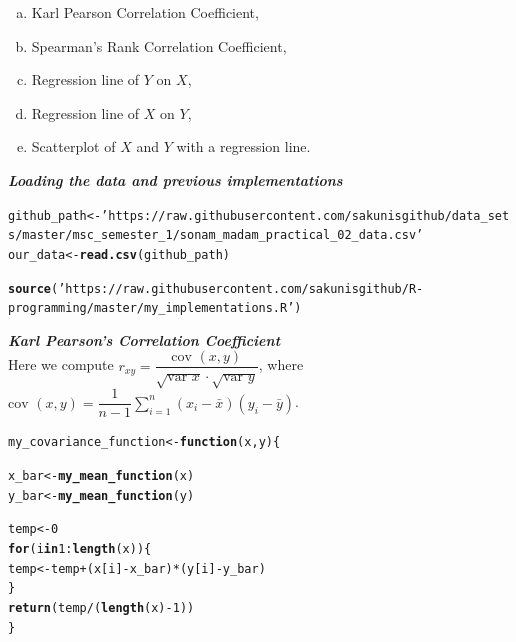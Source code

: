 \documentclass[11pt, a4paper]{article}\usepackage[]{graphicx}\usepackage[]{xcolor}
\makeatletter
\newcommand{\hlnum}[1]{\textcolor[rgb]{0.686,0.059,0.569}{#1}}%
\newcommand{\hlsng}[1]{\textcolor[rgb]{0.192,0.494,0.8}{#1}}%
\newcommand{\hlopt}[1]{\textcolor[rgb]{0,0,0}{#1}}%
\newcommand{\hldef}[1]{\textcolor[rgb]{0.345,0.345,0.345}{#1}}%
\newcommand{\hlkwa}[1]{\textcolor[rgb]{0.161,0.373,0.58}{\textbf{#1}}}%
\newcommand{\hlkwb}[1]{\textcolor[rgb]{0.69,0.353,0.396}{#1}}%
\newcommand{\hlkwc}[1]{\textcolor[rgb]{0.333,0.667,0.333}{#1}}%
\newcommand{\hlkwd}[1]{\textcolor[rgb]{0.737,0.353,0.396}{\textbf{#1}}}%
\newenvironment{kframe}{%
 \def\at@end@of@kframe{}%
 \ifinner\ifhmode%
  \def\at@end@of@kframe{\end{minipage}}%
  \begin{minipage}{\columnwidth}%
 \fi\fi%
 \def\FrameCommand##1{\hskip\@totalleftmargin \hskip-\fboxsep
 \colorbox{shadecolor}{##1}\hskip-\fboxsep
     \hskip-\linewidth \hskip-\@totalleftmargin \hskip\columnwidth}%
 \MakeFramed {\advance\hsize-\width
   \@totalleftmargin\z@ \linewidth\hsize
   \@setminipage}}%
 {\par\unskip\endMakeFramed%
 \at@end@of@kframe}
\newenvironment{knitrout}{}{} %
\makeatother
\begin{document}
\begin{enumerate}[(a)]
  \item Karl Pearson Correlation Coefficient,
  \item Spearman's Rank Correlation Coefficient,
  \item Regression line of $Y$ on $X$,
  \item Regression line of $X$ on $Y$,
  \item Scatterplot of $X$ and $Y$ with a regression line.
\end{enumerate}

\faArrowAltCircleRight[regular] \textit{\textbf{Loading the data and previous implementations}}

\begin{knitrout}\tiny
{}\color{fgcolor}\begin{kframe}
\begin{alltt}
\hldef{github_path} \hlkwb{<-} \hlsng{'https://raw.githubusercontent.com/sakunisgithub/data_sets/master/msc_semester_1/sonam_madam_practical_02_data.csv'}
\hldef{our_data} \hlkwb{<-} \hlkwd{read.csv}\hldef{(github_path)}

\hlkwd{source}\hldef{(}\hlsng{'https://raw.githubusercontent.com/sakunisgithub/R-programming/master/my_implementations.R'}\hldef{)}
\end{alltt}
\end{kframe}
\end{knitrout}

\newpage

\faArrowAltCircleRight[regular] \textit{\textbf{Karl Pearson's Correlation Coefficient}} \\

Here we compute $r_{xy} = \dfrac{\text{cov } (x, y)}{\sqrt{\text{var } x} \cdot \sqrt{\text{var } y}}$, where $\text{cov } (x, y) = \dfrac{1}{n-1} \sum \limits_{i = 1}^{n} (x_i - \bar{x})(y_i - \bar{y})$.

\begin{knitrout}\footnotesize
{}\color{fgcolor}\begin{kframe}
\begin{alltt}
\hldef{my_covariance_function} \hlkwb{<-} \hlkwa{function}\hldef{(}\hlkwc{x}\hldef{,} \hlkwc{y}\hldef{)\{}

  \hldef{x_bar} \hlkwb{<-} \hlkwd{my_mean_function}\hldef{(x)}
  \hldef{y_bar} \hlkwb{<-} \hlkwd{my_mean_function}\hldef{(y)}

  \hldef{temp} \hlkwb{<-} \hlnum{0}
  \hlkwa{for} \hldef{(i} \hlkwa{in} \hlnum{1}\hlopt{:}\hlkwd{length}\hldef{(x)) \{}
    \hldef{temp} \hlkwb{<-} \hldef{temp} \hlopt{+} \hldef{(x[i]} \hlopt{-} \hldef{x_bar)} \hlopt{*} \hldef{(y[i]} \hlopt{-} \hldef{y_bar)}
  \hldef{\}}
  \hlkwd{return}\hldef{(temp}\hlopt{/}\hldef{(}\hlkwd{length}\hldef{(x)} \hlopt{-} \hlnum{1}\hldef{))}
\hldef{\}}
\end{alltt}
\end{kframe}
\end{knitrout}
\end{document}
